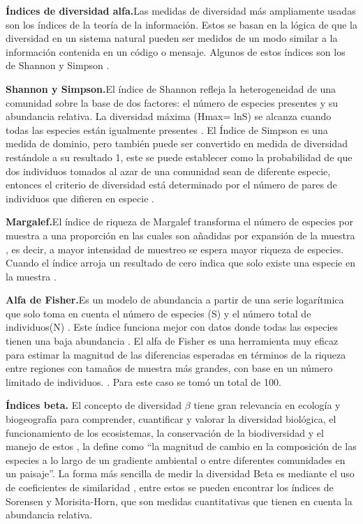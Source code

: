 \documentclass[conference,final,12pt,]{IEEEtran}
\begin{document}
\textbf{Índices de diversidad alfa.}Las medidas de diversidad más
ampliamente usadas son los índices de la teoría de la información. Estos
se basan en la lógica de que la diversidad en un
sistema natural pueden ser medidos de un modo similar a la información
contenida en un código o mensaje. Algunos de estos índices 
son los de Shannon y Simpson \citep{B}.

\textbf{Shannon y Simpson.}El índice de Shannon
refleja la heterogeneidad de una comunidad sobre la base de dos
factores: el número de especies presentes y su abundancia relativa. La
diversidad máxima (Hmax= lnS) se alcanza cuando todas las especies están
igualmente presentes \citep{L}. El Índice de Simpson es una medida de dominio,
pero también puede ser convertido en medida de diversidad restándole a
su resultado 1, este se puede establecer como la probabilidad de que dos
individuos tomados al azar de una comunidad sean de diferente especie, entonces el
criterio de diversidad está determinado por el número de pares de
individuos que difieren en especie \citep{M}.

\textbf{Margalef.}El índice de riqueza de Margalef transforma el número de
especies por muestra a una proporción en las cuales son añadidas por
expansión de la muestra \citep{N}, es decir, a mayor intensidad de muestreo
se espera mayor riqueza de especies. Cuando el índice arroja un resultado 
de cero indica que solo existe una especie en la
muestra \citep{N}. 

\textbf{Alfa de Fisher.}Es un modelo de abundancia a partir de una serie logarítmica que solo toma
en cuenta el número de especies (S) y el número total de individuos(N)
\citep{P}. Este índice funciona mejor con datos donde todas las especies
tienen una baja abundancia \citep{Q}. El alfa de Fisher es una
herramienta muy eficaz para estimar la magnitud de las diferencias
esperadas en términos de la riqueza entre regiones con tamaños de
muestra más grandes, con base en un número limitado de individuos.
\citep{R}. Para este caso se tomó un total de 100.

\textbf{Índices beta.} El concepto de diversidad \(\beta\) tiene gran relevancia
en ecología y biogeografía para comprender, cuantificar y valorar la
diversidad biológica, el funcionamiento de los ecosistemas, la conservación de la biodiversidad y el manejo de estos \citep{O}, \citep{AP} la define
como ``la magnitud de cambio en la composición de las especies a lo
largo de un gradiente ambiental o entre diferentes comunidades en un
paisaje''. La forma más sencilla de medir la diversidad Beta es mediante
el uso de coeficientes de similaridad \citep{B}, entre estos se pueden
encontrar los índices de Sorensen y Morisita-Horn, que son medidas
cuantitativas que tienen en cuenta la abundancia relativa.
\end{document}
